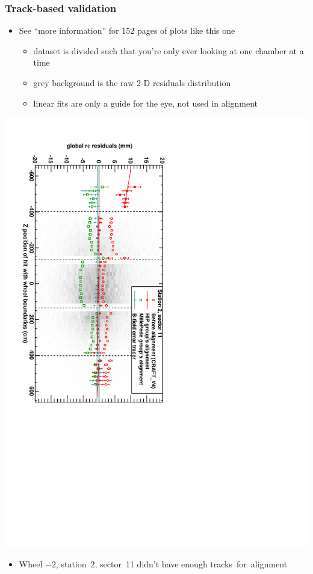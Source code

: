 \documentclass[compress]{beamer}
\begin{document}
\begin{frame}
\frametitle{Track-based validation}

\begin{itemize}
\item See ``more information'' for 152 pages of plots like this one
\begin{itemize}
\item dataset is divided such that you're only ever looking at one chamber at a time
\item grey background is the raw 2-D residuals distribution
\item linear fits are only a guide for the eye, not used in alignment
\end{itemize}
\end{itemize}

\vspace{-0.4 cm}
\begin{center}
\includegraphics[height=0.95\linewidth, angle=90]{DTrphiVsZ_st2_sr11.pdf}
\end{center}

\vspace{-0.5 cm}
\begin{itemize}
\item Wheel $-$2, station~2, sector~11 didn't have enough \mbox{tracks for alignment\hspace{-1 cm}}
\end{itemize}
\end{frame}
\end{document}
